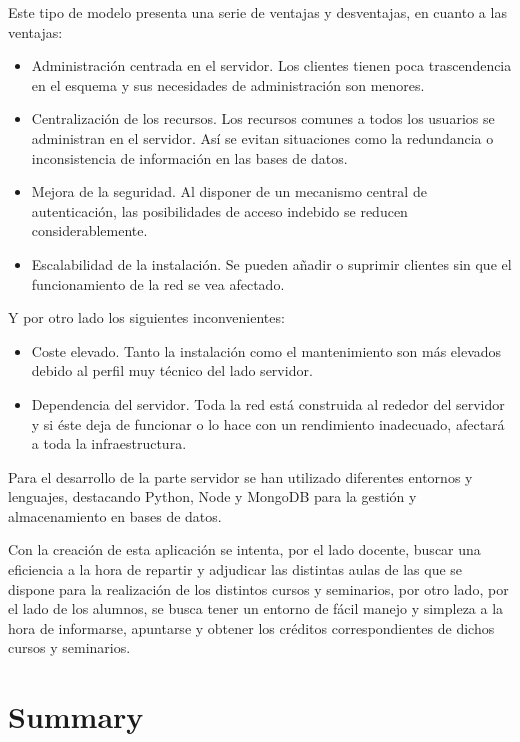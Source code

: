 \documentclass[a4paper, 12pt]{book}
\begin{document}
	Este tipo de modelo presenta una serie de ventajas y desventajas, en cuanto a las ventajas:
	\begin{itemize}
  \item Administración centrada en el servidor. Los clientes tienen poca trascendencia en el esquema y sus necesidades de administración son menores.
  \item Centralización de los recursos. Los recursos comunes a todos los usuarios se administran en el servidor. Así se evitan situaciones como la redundancia o inconsistencia de información en las bases de datos.
  \item Mejora de la seguridad. Al disponer de un mecanismo central de autenticación, las posibilidades de acceso indebido se reducen considerablemente.
  \item Escalabilidad de la instalación. Se pueden añadir o suprimir clientes sin que el funcionamiento de la red se vea afectado.
\end{itemize}

	Y por otro lado los siguientes inconvenientes:
	\begin{itemize}
  \item Coste elevado. Tanto la instalación como el mantenimiento son más elevados debido al perfil muy técnico del lado servidor.
  \item Dependencia del servidor. Toda la red está construida al rededor del servidor y si éste deja de funcionar o lo hace con un rendimiento inadecuado, afectará a toda la infraestructura.
\end{itemize}
	

	Para el desarrollo de la parte servidor se han utilizado diferentes entornos y lenguajes, destacando Python, Node y MongoDB para la gestión y almacenamiento en bases de datos.
	
	Con la creación de esta aplicación se intenta, por el lado docente, buscar una eficiencia a la hora de repartir y adjudicar las distintas aulas de las que se dispone para la realización de los distintos cursos y seminarios, por otro lado, por el lado de los alumnos, se busca tener un entorno de fácil manejo y simpleza a la hora de informarse, apuntarse y obtener los créditos correspondientes de dichos cursos y seminarios.


\chapter*{Summary}
\end{document}
